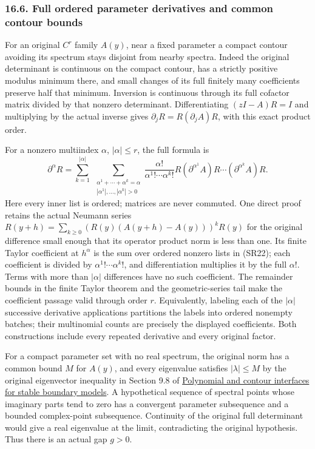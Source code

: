 \documentclass[
  11pt,
]{article}
\begin{document}
\subsubsection{16.6. Full ordered parameter derivatives and common
contour
bounds}\label{full-ordered-parameter-derivatives-and-common-contour-bounds}

For an original \(C^r\) family \(A(y)\), near a fixed parameter a
compact contour avoiding its spectrum stays disjoint from nearby
spectra. Indeed the original determinant is continuous on the compact
contour, has a strictly positive modulus minimum there, and small
changes of its full finitely many coefficients preserve half that
minimum. Inversion is continuous through its full cofactor matrix
divided by that nonzero determinant. Differentiating \((zI-A)R=I\) and
multiplying by the actual inverse gives \(\partial_jR=R(\partial_jA)R\),
with this exact product order.

For a nonzero multiindex \(\alpha\), \(|\alpha|\leq r\), the full
formula is \[
 \partial^\alpha R
 =\sum_{k=1}^{|\alpha|}
   \ \sum_{\substack{\alpha^1+\cdots+\alpha^k=\alpha\\
                     |\alpha^1|,\ldots,|\alpha^k|>0}}
    \frac{\alpha!}{\alpha^1!\cdots\alpha^k!}
    R(\partial^{\alpha^1}A)R\cdots
                      (\partial^{\alpha^k}A)R.               \tag{SR22}
\] Here every inner list is ordered; matrices are never commuted. One
direct proof retains the actual Neumann series
\(R(y+h)=\sum_{k\geq0}(R(y)(A(y+h)-A(y)))^kR(y)\) for the original
difference small enough that its operator product norm is less than one.
Its finite Taylor coefficient at \(h^\alpha\) is the sum over ordered
nonzero lists in (SR22); each coefficient is divided by
\(\alpha^1!\cdots\alpha^k!\), and differentiation multiplies it by the
full \(\alpha!\). Terms with more than \(|\alpha|\) differences have no
such coefficient. The remainder bounds in the finite Taylor theorem and
the geometric-series tail make the coefficient passage valid through
order \(r\). Equivalently, labeling each of the \(|\alpha|\) successive
derivative applications partitions the labels into ordered nonempty
batches; their multinomial counts are precisely the displayed
coefficients. Both constructions include every repeated derivative and
every original factor.

For a compact parameter set with no real spectrum, the original norm has
a common bound \(M\) for \(A(y)\), and every eigenvalue satisfies
\(|\lambda|\leq M\) by the original eigenvector inequality in Section
9.8 of \href{stable-prerequisite-bridges.pdf}{Polynomial and contour
interfaces for stable boundary models}. A hypothetical sequence of
spectral points whose imaginary parts tend to zero has a convergent
parameter subsequence and a bounded complex-point subsequence.
Continuity of the original full determinant would give a real eigenvalue
at the limit, contradicting the original hypothesis. Thus there is an
actual gap \(g>0\).
\end{document}
